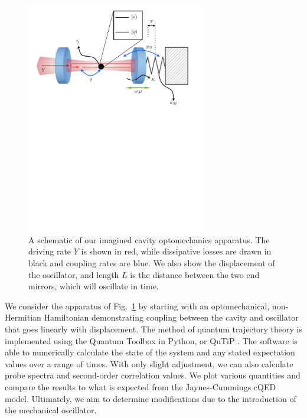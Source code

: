 \begin{figure}[htb]
\begin{center}
\includegraphics[width=0.7\textwidth]{Figures/1Apparatus}
\caption[A schematic of our imagined cavity optomechanics apparatus]{\small{A schematic of our imagined cavity optomechanics apparatus. The driving rate $Y$ is shown in red, while dissipative losses are drawn in black and coupling rates are blue. We also show the displacement of the oscillator, and length $L$ is the distance between the two end mirrors, which will oscillate in time.}}
\label{fig1Apparatus}
\end{center}
\end{figure}

We consider the apparatus of Fig.~\ref{fig1Apparatus} by starting with an optomechanical, non-Hermitian Hamiltonian demonstrating coupling between the cavity and oscillator that goes linearly with displacement. The method of quantum trajectory theory is implemented using the Quantum Toolbox in Python, or QuTiP \cite{qutipref}. The software is able to numerically calculate the state of the system and any stated expectation values over a range of times. With only slight adjustment, we can also calculate probe spectra and second-order correlation values. We plot various quantities and compare the results to what is expected from the Jaynes-Cummings cQED model. Ultimately, we aim to determine modifications due to the introduction of the mechanical oscillator.

